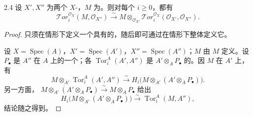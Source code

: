 \begin{SGAresult}{}{2.4}
设 $X',X''$ 为两个 $X$-，$M$ 为。则对每个 $i\geq0$，都有
\[
\mathcal{T}or_i^{\mathcal O_X}(M,\mathcal O_{X''})
\xrightarrow{\sim}M\otimes_{\mathcal O_{X'}}\mathcal{T}or_i^{\mathcal O_X}(\mathcal O_{X'},\mathcal O_{X''}).
\]
\end{SGAresult}
\begin{proof}
只须在情形下定义一个具有的，随后即可通过在情形下整体定义它。

设 $X=\operatorname{Spec}(A)$，$X'=\operatorname{Spec}(A')$，$X''=\operatorname{Spec}(A'')$；$M$ 由 $M$ 定义。设 $P_\bullet$ 是 $A''$ 在 $A$ 上的一个；各 $\operatorname{Tor}_i^A(A',A'')$ 是 $A'\otimes_A P_\bullet$ 的。因 $M$ 在 $A'$ 上，有
\[
M\otimes_{A'}\operatorname{Tor}_i^A(A',A'')\xrightarrow{\sim}H_i\bigl(M\otimes_{A'}(A'\otimes_A P_\bullet)\bigr).
\]
另一方面， $M\otimes_{A'}(A'\otimes_A P_\bullet)\xrightarrow{\sim}M\otimes_A P_\bullet$ 给出
\[
H_i\bigl(M\otimes_{A'}(A'\otimes_A P_\bullet)\bigr)\xrightarrow{\sim}\operatorname{Tor}_i^A(M,A''),
\]
结论随之得到。
\end{proof}

